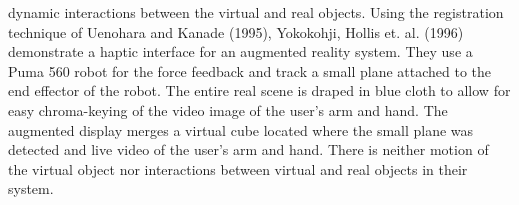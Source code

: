 dynamic interactions between the virtual and real objects. Using the registration technique of Uenohara and Kanade (1995), Yokokohji, Hollis et. al. (1996) demonstrate a haptic interface for an augmented reality system. They use a Puma 560 robot for the force feedback and track a small plane attached to the end effector of the robot. The entire real scene is draped in blue cloth to allow for easy chroma-keying of the video image of the user’s arm and hand. The augmented display merges a virtual cube located where the small plane was detected and live video of the user’s arm and hand. There is neither motion of the virtual object nor interactions between virtual and real objects in their system.
